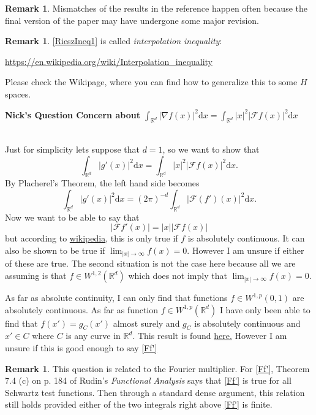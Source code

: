 \documentclass[a4paper,11pt]{article}
\numberwithin{equation}{section}
\theoremstyle{plain}
\theoremstyle{definition}
\newtheorem{remark}[theorem]{Remark}
\newcommand{\ud}{\ensuremath{\mathrm{d} }}
\newcommand{\R}{\mathbb{R}}
\newcounter{NQ}
\newenvironment{NickQuestion}[1][] %
{\refstepcounter{NQ}
	\begin{mdframed}[backgroundcolor=lightgray]\textbf{Nick's Question \theNQ \: #1~~}~~~\noindent}%
	{\end{mdframed}}
\numberwithin{NQ}{section}
\numberwithin{LQ}{section}
\numberwithin{ZQ}{section}
\begin{document}
\begin{remark}
	Mismatches of the results in the reference happen often because the final version of the paper
	may have undergone some major revision.
\end{remark}

\begin{remark}
	\eqref{RieszIneq1} is called {\it interpolation inequality}:
	\begin{center}
		\url{https://en.wikipedia.org/wiki/Interpolation_inequality}
	\end{center}
	Please check the Wikipage, where you
	can find how to generalize this to some $H$ spaces.
\end{remark}

\begin{NickQuestion}[Concern about $\int_{\R^d} |\nabla f(x)|^2 \ud x = \int_{\R^d} |x|^2|\mathcal{F}f(x)|^2 \ud x$]

Just for simplicity lets suppose that $d=1$, so we want to show that
	\[
		\int_{\R^d} |g'(x)|^2 \ud x = \int_{\R^d} |x|^2 |\mathcal{F}f(x)|^2 \ud x.
	\]
By Placherel's Theorem, the left hand side becomes
	\[
		\int_{\R^d} |g'(x)|^2 \ud x  = (2\pi)^{-d} \int_{\R^d} |\mathcal{F}(f')(x)|^2 \ud x.
	\]
Now we want to be able to say that
	\begin{equation}\label{Ff'}
		|\mathcal{F}{f'}(x)| = |x| |\mathcal{F}f(x)|
	\end{equation}
but according to \href{https://en.wikipedia.org/wiki/Fourier_transform#Differentiation}{wikipedia}, this is only true if $f$ is absolutely continuous. It can also be shown to be true if $\lim_{|x|\to \infty} f(x) = 0$. However I am unsure if either of these are true. The second situation is not the case here because all we are assuming is that $f \in W^{1,2}(\R^d)$ which does not imply that $\lim_{|x|\to \infty} f(x) = 0$.

As far as absolute continuity, I can only find that functions $f \in W^{1,p}(0,1)$ are absolutely continuous. As far as function $f \in W^{1,p}(\R^d)$ I have only been able to find that $f(x')=g_C(x')$ almost surely and $g_C$ is absolutely continuous and $x' \in C$ where $C$ is any curve in $\R^d$. This result is found \href{https://math.stackexchange.com/questions/908175/is-a-sobolev-function-absolutely-continuous-with-respect-to-a-e-segment-of-line}{here.} However I am unsure if this is good enough to say \eqref{Ff'}
\end{NickQuestion}

\begin{remark}
	This question is related to the Fourier multiplier.
	For \eqref{Ff'}, Theorem 7.4 (c) on p. 184 of Rudin's {\it Functional Analysis} says that \eqref{Ff'} is true for all Schwartz test functions.
	Then through a standard dense argument, this relation still holds provided either of the two integrals right above \eqref{Ff'} is finite.
\end{remark}
\end{document}
